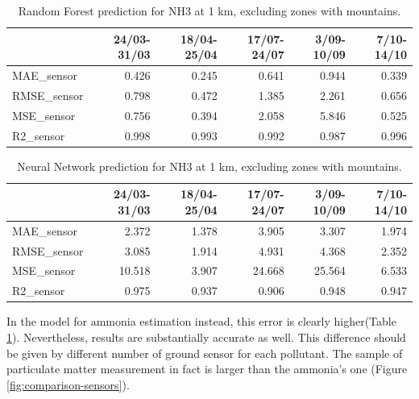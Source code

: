 \begin{table}[H]
\begin{tabular}{lrrrrr}
\toprule
  &  24/03-31/03 &  18/04-25/04 &  17/07-24/07 &  3/09-10/09 &  7/10-14/10 \\
\midrule
 MAE\_sensor &        0.426 &        0.245 &        0.641 &       0.944 &       0.339 \\
RMSE\_sensor &        0.798 &        0.472 &        1.385 &       2.261 &       0.656 \\
 MSE\_sensor &        0.756 &        0.394 &        2.058 &       5.846 &       0.525 \\
  R2\_sensor &        0.998 &        0.993 &        0.992 &       0.987 &       0.996 \\

\bottomrule
\end{tabular}
\caption{Random Forest prediction for NH3 at 1 km, excluding zones with mountains.}
\label{tab:nh3RF}
\end{table}
\begin{table}[H]
\begin{tabular}{lrrrrr}
\toprule
  &  24/03-31/03 &  18/04-25/04 &  17/07-24/07 &  3/09-10/09 &  7/10-14/10 \\
\midrule
 MAE\_sensor &        2.372 &        1.378 &        3.905 &       3.307 &       1.974 \\
RMSE\_sensor &        3.085 &        1.914 &        4.931 &       4.368 &       2.352 \\
 MSE\_sensor &       10.518 &        3.907 &       24.668 &      25.564 &       6.533 \\
  R2\_sensor &        0.975 &        0.937 &        0.906 &       0.948 &       0.947 \\
\bottomrule
\end{tabular}
\caption{Neural Network prediction for NH3 at 1 km, excluding zones with mountains.}
\label{tab:nh3NN}
\end{table}
In the model for ammonia estimation instead, this error is clearly higher(Table \ref{tab:nh3RF}).
Nevertheless, results are substantially accurate as well. 
This difference should be given by different number of ground sensor for each pollutant. The sample of particulate matter measurement in fact is larger than the ammonia's one (Figure \ref{fig:comparison-sensors}).
